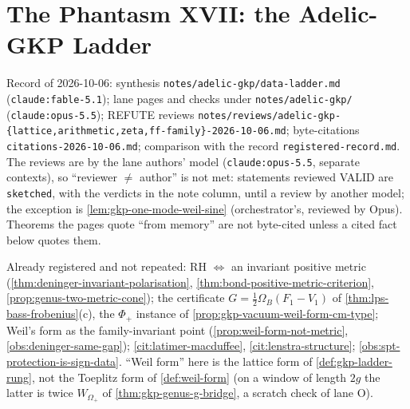 
\section{The Phantasm XVII: the Adelic-GKP Ladder}
\label{sec:adelic-gkp-ladder}

Record of 2026-10-06: synthesis \texttt{notes/adelic-gkp/data-ladder.md} (\texttt{claude:fable-5.1}); lane pages and checks under \texttt{notes/adelic-gkp/}
(\texttt{claude:opus-5.5}); REFUTE reviews \texttt{notes/reviews/adelic-gkp-\{lattice,arithmetic,zeta,ff-family\}-2026-10-06.md}; byte-citations \texttt{citations-2026-10-06.md};
comparison with the record \texttt{registered-record.md}. The reviews are by the lane authors' model (\texttt{claude:opus-5.5}, separate contexts), so ``reviewer $\ne$ author''
is not met: statements reviewed VALID are \texttt{sketched}, with the verdicts in the note column, until a review by another model; the exception is
\cref{lem:gkp-one-mode-weil-sine} (orchestrator's, reviewed by Opus). Theorems the pages quote ``from memory'' are not byte-cited unless a cited fact below quotes them.

Already registered and not repeated: RH $\Leftrightarrow$ an invariant positive metric (\cref{thm:deninger-invariant-polarisation}, \cref{thm:bond-positive-metric-criterion},
\cref{prop:genus-two-metric-cone}); the certificate $G = \tfrac12\Omega_B(F_1-V_1)$ of \cref{thm:lps-bass-frobenius}(c), the $\Phi_+$ instance of %
\cref{prop:gkp-vacuum-weil-form-cm-type}; Weil's form as the family-invariant point (\cref{prop:weil-form-not-metric}, \cref{obs:deninger-same-gap});
\cref{cit:latimer-macduffee}, \cref{cit:lenstra-structure}; \cref{obs:spt-protection-is-sign-data}. ``Weil form'' here is the lattice form of \cref{def:gkp-ladder-rung}, not the
Toeplitz form of \cref{def:weil-form} (on a window of length $2g$ the latter is twice $W_{\Omega_+}$ of \cref{thm:gkp-genus-g-bridge}, a scratch check of lane O). %

